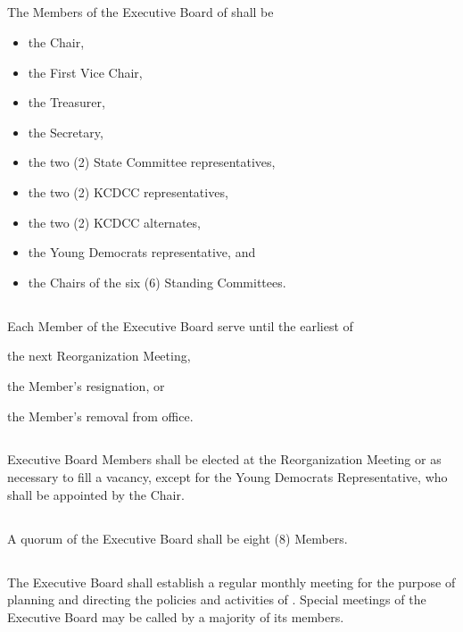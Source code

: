 \subsection{} \label{exec-board}
The Members of the Executive Board of \thedistrict{} shall be
\begin{itemize}
    \item the Chair,
    \item the First Vice Chair,
    \item the Treasurer,
    \item the Secretary,
    \item the two (2) State Committee representatives,
    \item the two (2) KCDCC representatives,
    \item the two (2) KCDCC alternates,
    \item the Young Democrats representative, and
    \item the Chairs of the six (6) Standing Committees.
\end{itemize}

\subsection{}
Each Member of the Executive Board serve until the earliest of
\begin{inlinealphalist}
    \item the next Reorganization Meeting,
    \item the Member's resignation, or
    \item the Member's removal from office.
\end{inlinealphalist}

\subsection{}
Executive Board Members shall be elected at the Reorganization Meeting or as necessary to fill a vacancy, except for the Young Democrats Representative, who shall be appointed by the Chair.

\subsection{}
A quorum of the Executive Board shall be eight (8) Members.

\subsection{}
The Executive Board shall establish a regular monthly meeting for the purpose of planning and directing the policies and activities of \thedistrict{}. Special meetings of the Executive Board may be called by a majority of its members.

